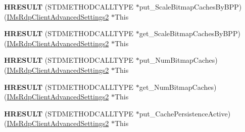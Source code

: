\begin{DoxyCompactItemize}
\item 
\mbox{\label{struct_m_s_t_s_c_lib_1_1_i_ms_rdp_client_advanced_settings2_vtbl_a675b7e52052fa3d8467717fe93915dc0}} 
{\bfseries H\+R\+E\+S\+U\+LT} (S\+T\+D\+M\+E\+T\+H\+O\+D\+C\+A\+L\+L\+T\+Y\+PE $\ast$put\+\_\+\+Scale\+Bitmap\+Caches\+By\+B\+PP)(\hyperlink{interface_m_s_t_s_c_lib_1_1_i_ms_rdp_client_advanced_settings2}{I\+Ms\+Rdp\+Client\+Advanced\+Settings2} $\ast$This
\item 
\mbox{\label{struct_m_s_t_s_c_lib_1_1_i_ms_rdp_client_advanced_settings2_vtbl_ab08985b3932493b4e483accb9adea988}} 
{\bfseries H\+R\+E\+S\+U\+LT} (S\+T\+D\+M\+E\+T\+H\+O\+D\+C\+A\+L\+L\+T\+Y\+PE $\ast$get\+\_\+\+Scale\+Bitmap\+Caches\+By\+B\+PP)(\hyperlink{interface_m_s_t_s_c_lib_1_1_i_ms_rdp_client_advanced_settings2}{I\+Ms\+Rdp\+Client\+Advanced\+Settings2} $\ast$This
\item 
\mbox{\label{struct_m_s_t_s_c_lib_1_1_i_ms_rdp_client_advanced_settings2_vtbl_a15619b9dd24e326b722c320ee66b886d}} 
{\bfseries H\+R\+E\+S\+U\+LT} (S\+T\+D\+M\+E\+T\+H\+O\+D\+C\+A\+L\+L\+T\+Y\+PE $\ast$put\+\_\+\+Num\+Bitmap\+Caches)(\hyperlink{interface_m_s_t_s_c_lib_1_1_i_ms_rdp_client_advanced_settings2}{I\+Ms\+Rdp\+Client\+Advanced\+Settings2} $\ast$This
\item 
\mbox{\label{struct_m_s_t_s_c_lib_1_1_i_ms_rdp_client_advanced_settings2_vtbl_a30287fdb3ebb13e3f11a8274d66c32da}} 
{\bfseries H\+R\+E\+S\+U\+LT} (S\+T\+D\+M\+E\+T\+H\+O\+D\+C\+A\+L\+L\+T\+Y\+PE $\ast$get\+\_\+\+Num\+Bitmap\+Caches)(\hyperlink{interface_m_s_t_s_c_lib_1_1_i_ms_rdp_client_advanced_settings2}{I\+Ms\+Rdp\+Client\+Advanced\+Settings2} $\ast$This
\item 
\mbox{\label{struct_m_s_t_s_c_lib_1_1_i_ms_rdp_client_advanced_settings2_vtbl_ad5cda806f6d712f786affa29e9582964}} 
{\bfseries H\+R\+E\+S\+U\+LT} (S\+T\+D\+M\+E\+T\+H\+O\+D\+C\+A\+L\+L\+T\+Y\+PE $\ast$put\+\_\+\+Cache\+Persistence\+Active)(\hyperlink{interface_m_s_t_s_c_lib_1_1_i_ms_rdp_client_advanced_settings2}{I\+Ms\+Rdp\+Client\+Advanced\+Settings2} $\ast$This

\end{DoxyCompactItemize}
